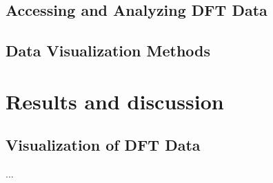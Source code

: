 \documentclass[twoside,twocolumn,9pt]{article}
\begin{document}
\subsection*{Accessing and Analyzing DFT Data}

\subsection*{Data Visualization Methods}

\newpage




\section*{Results and discussion}

\subsection*{Visualization of DFT Data}

... \\

\end{document}
